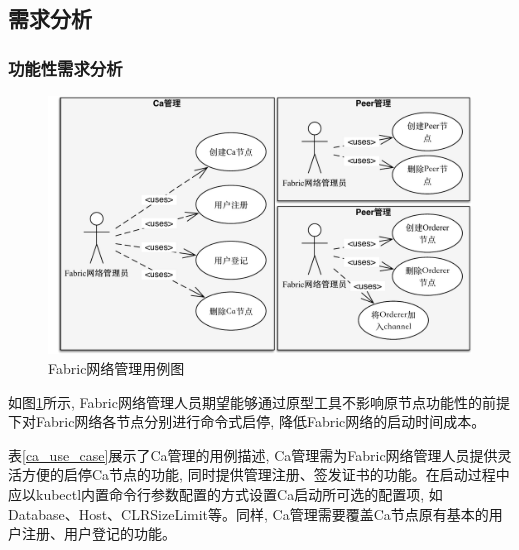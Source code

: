 \subsection{需求分析} \label{section: requirement}

\subsubsection{功能性需求分析}

\begin{figure}[!htbp] %
    \centering %
    \includegraphics[width=1.0\textwidth]{FIGs/chapter4/fabric_use_case.pdf} %
    \caption{Fabric网络管理用例图} %
    \label{fabric_use_case} %
\end{figure}%


如图\ref{fabric_use_case}所示, Fabric网络管理人员期望能够通过原型工具不影响原节点功能性的前提下对Fabric网络各节点分别进行命令式启停, 降低Fabric网络的启动时间成本。



表\ref{ca_use_case}展示了Ca管理的用例描述, Ca管理需为Fabric网络管理人员提供灵活方便的启停Ca节点的功能, 同时提供管理注册、签发证书的功能。在启动过程中应以kubectl内置命令行参数配置的方式设置Ca启动所可选的配置项, 如Database、Host、CLRSizeLimit等。同样, Ca管理需要覆盖Ca节点原有基本的用户注册、用户登记的功能。

